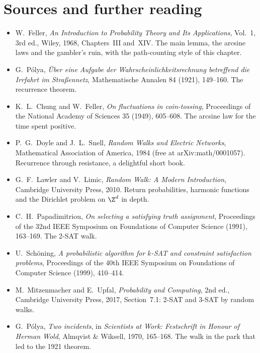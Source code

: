 \section*{Sources and further reading}

\begin{itemize}
\item W.~Feller, \emph{An Introduction to Probability Theory and Its Applications}, Vol.~1, 3rd ed., Wiley, 1968,
Chapters~III and~XIV. The main lemma, the arcsine laws and the gambler's ruin, with the path-counting style of this
chapter.
\item G.~Pólya, \emph{Über eine Aufgabe der Wahrscheinlichkeitsrechnung betreffend die Irrfahrt im Straßennetz},
Mathematische Annalen 84 (1921), 149--160. The recurrence theorem.
\item K.~L.~Chung and W.~Feller, \emph{On fluctuations in coin-tossing}, Proceedings of the National Academy of Sciences 35
(1949), 605--608. The arcsine law for the time spent positive.
\item P.~G.~Doyle and J.~L.~Snell, \emph{Random Walks and Electric Networks}, Mathematical Association of America, 1984
(free at arXiv:math/0001057). Recurrence through resistance, a delightful short book.
\item G.~F.~Lawler and V.~Limic, \emph{Random Walk: A Modern Introduction}, Cambridge University Press, 2010. Return
probabilities, harmonic functions and the Dirichlet problem on $\Z^d$ in depth.
\item C.~H.~Papadimitriou, \emph{On selecting a satisfying truth assignment}, Proceedings of the 32nd IEEE Symposium on
Foundations of Computer Science (1991), 163--169. The 2-SAT walk.
\item U.~Schöning, \emph{A probabilistic algorithm for $k$-SAT and constraint satisfaction problems}, Proceedings of the
40th IEEE Symposium on Foundations of Computer Science (1999), 410--414.
\item M.~Mitzenmacher and E.~Upfal, \emph{Probability and Computing}, 2nd ed., Cambridge University Press, 2017,
Section~7.1: 2-SAT and 3-SAT by random walks.
\item G.~P\'olya, \emph{Two incidents}, in \emph{Scientists at Work: Festschrift in Honour of Herman Wold}, Almqvist \& Wiksell, 1970, 165--168. The walk in the park that led to the 1921 theorem.
\end{itemize}
